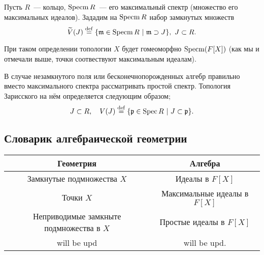 Пусть $R$~--- кольцо, $\operatorname{Specm}{R}$~--- его максимальный спектр (множество его максимальных идеалов). 
Зададим на $\operatorname{Specm}{R}$ набор замкнутых множеств 
\[
	\widetilde{V}(J) \eqdef \{ \fm \in \Specm{R} \ \vert \ \fm \supset J \}, \ J \subset R. 
\]


При таком определении топологии $X$ будет гомеоморфно $\operatorname{Specm}(F[X])$ (как мы и отмечали выше, точки соотвествуют максимальным идеалам).

В случае незамкнутого поля или бесконечнопорожденных алгебр правильно вместо максимального спектра рассматривать простой спектр. Топология Зарисского на нём определяется следующим образом; 
\[
	J \subset R, \quad V(J) \stackrel{\mathrm{def}}{=} \{ \mathfrak{p} \in \operatorname{Spec}{R} \ \vert \ J \subset \mathfrak{p} \}.
\]

\subsection{Словарик алгебраической геометрии}

\begin{center}
	\begin{tabular}{ |c|c| }
		\hline
		Геометрия & Алгебра \\
		\hline
		Замкнутые подмножества $X$ & Идеалы в $F[X]$ \\
		Точки $X$ & Максимальные идеалы в $F[X]$ \\ 
		Неприводимые замкныте подмножества в $X$ & Простые идеалы в $F[X]$ \\ 
		will be upd & will be upd.\\
		\hline
	\end{tabular}
\end{center}

	




























